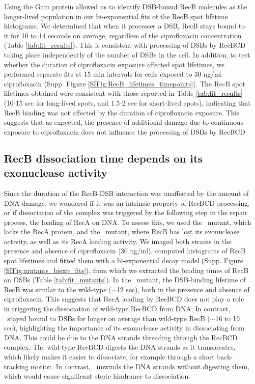 Using the Gam protein allowed us to identify DSB-bound RecB molecules as the longer-lived population in our bi-exponential fits of the RecB spot lifetime histograms. We determined that when it processes a DSB, RecB stays bound to it for 10 to 14 seconds on average, regardless of the ciprofloxacin concentration (Table \ref{tab:fit_results}). This is consistent with processing of DSBs by RecBCD taking place independently of the number of DSBs in the cell. In addition, to test whether the duration of ciprofloxacin exposure affected spot lifetimes, we performed separate fits at 15 min intervals for cells exposed to 30 ng/ml ciprofloxacin (Supp. Figure \ref{SIFig:RecB_lifetimes_timepoints}). The RecB spot lifetimes obtained were consistent with those reported in Table \ref{tab:fit_results} (10-15 sec for long-lived spots, and 1.5-2 sec for short-lived spots), indicating that RecB binding was not affected by the duration of ciprofloxacin exposure. This suggests that as expected, the presence of additional damage due to continuous exposure to ciprofloxacin does not influence the processing of DSBs by RecBCD

\subsection*{RecB dissociation time depends on its exonuclease activity}
Since the duration of the RecB-DSB interaction was unaffected by the amount of DNA damage, we wondered if it was an intrinsic property of RecBCD processing, or if dissociation of the complex was triggered by the following step in the repair process, the loading of RecA on DNA. To assess this, we used the \dreca\ mutant, which lacks the RecA protein, and the \geneteneighty\ mutant, where RecB has lost its exonuclease activity, as well as its RecA loading activity. We imaged both strains in the presence and absence of ciprofloxacin (30 ng/ml), computed histograms of RecB spot lifetimes and fitted them with a bi-exponential decay model (Supp. Figure \ref{SIFig:mutants_biexp_fits}), from which we extracted the binding times of RecB on DSBs (Table \ref{tab:fit_mutants}). In the \dreca\ mutant, the DSB-binding lifetime of RecB was similar to the wild-type ($\sim$12 sec), both in the presence and absence of ciprofloxacin. This suggests that RecA loading by RecBCD does not play a role in triggering the dissociation of wild-type RecBCD from DNA. In contrast, \teneighty\ stayed bound to DSBs for longer on average than wild-type RecB ($\sim$16 to 19 sec), highlighting the importance of its exonuclease activity in dissociating from DNA. This could be due to the DNA strands threading through the RecBCD complex. The wild-type RecBCD digests the DNA strands as it translocates, which likely makes it easier to dissociate, for example through a short back-tracking motion. In contrast, \teneighty\ unwinds the DNA strands without digesting them, which would cause significant steric hindrance to dissociation.

